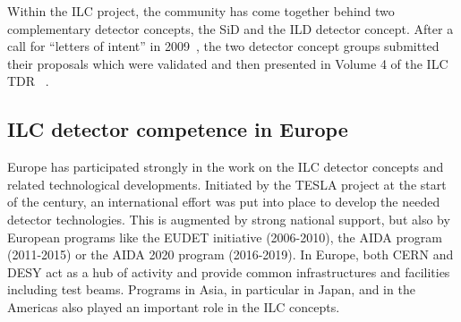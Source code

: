 \documentclass[%
 reprint,
 amsmath,amssymb,
 aps,
]{revtex4-1}
\begin{document}
Within the ILC project, the community has come together behind two complementary detector concepts, the SiD and the ILD detector concept. After a call for ``letters of intent'' in 2009~\cite{Aihara:2009ad,Abe:2010aa}, the two detector concept groups submitted their proposals which were validated and then presented in Volume 4 of the ILC TDR ~\cite{Behnke:2013lya}.

\subsection{ILC detector competence in Europe~\label{sec:det:competence}}
Europe has participated strongly in the work on the ILC detector concepts and related technological developments. Initiated by the TESLA project at the start of the century, an international effort was put into place to develop the needed detector technologies. This is augmented by strong national support, but also by European programs like the EUDET initiative (2006-2010), the AIDA program (2011-2015) or the AIDA 2020 program (2016-2019). In Europe, both CERN and DESY act as a hub of activity and provide common infrastructures and facilities including test beams. Programs in Asia, in particular in Japan, and in the Americas also played an important role in the ILC concepts. 
\end{document}
